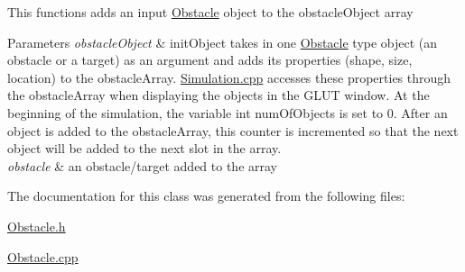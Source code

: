 This functions adds an input \hyperlink{classObstacle}{Obstacle} object to the obstacle\-Object array


\begin{DoxyParams}{Parameters}
{\em obstacle\-Object} & init\-Object takes in one \hyperlink{classObstacle}{Obstacle} type object (an obstacle or a target) as an argument and adds its properties (shape, size, location) to the obstacle\-Array. \hyperlink{Simulation_8cpp}{Simulation.\-cpp} accesses these properties through the obstacle\-Array when displaying the objects in the G\-L\-U\-T window. At the beginning of the simulation, the variable int num\-Of\-Objects is set to 0. After an object is added to the obstacle\-Array, this counter is incremented so that the next object will be added to the next slot in the array.\\
\hline
{\em obstacle} & an obstacle/target added to the array \\
\hline
\end{DoxyParams}


The documentation for this class was generated from the following files\-:\begin{DoxyCompactItemize}
\item 
\hyperlink{Obstacle_8h}{Obstacle.\-h}\item 
\hyperlink{Obstacle_8cpp}{Obstacle.\-cpp}\end{DoxyCompactItemize}
